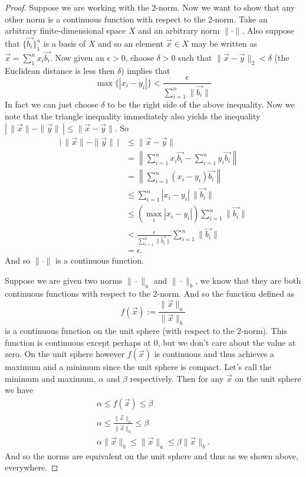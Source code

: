 \documentclass[12pt]{article}
\theoremstyle{theorem}
\theoremstyle{definition}
\begin{document}
\begin{proof}
Suppose we are working with the 2-norm.  Now we want to show that any other
norm is a continuous function with respect to the 2-norm.
Take an arbitrary finite-dimensional space $X$ and
an arbitrary norm $\|\cdot\|$.
Also suppose that $\{ \vec{b_i} \}_1^n$ is a basis of $X$ and so an element
$\vec{x} \in X$ may be written as $\vec{x} = \sum_1^n x_i \vec{b_i}$.
Now given an
$\epsilon > 0$, choose $\delta > 0$ such that  $\| \vec{x} - \vec{y} \|_2 <
\delta$ (the Euclidean distance is less then $\delta$) implies that
\begin{equation*}
\max \{ | x_i - y_i | \} < \frac{\epsilon}{\sum_{i=1}^{n} \|\vec{b_i}\|}
\end{equation*}
In fact we can just choose $\delta$ to be the right side of
the above inequality.
Now we note that the triangle inequality immediately also yields the
inequality $|\,\|\vec{x}\| - \|\vec{y}\|\,| \leq \|\vec{x}-\vec{y}\|$.  So
\begin{equation*}
\begin{split}
\big|\,\|\vec{x}\| - \|\vec{y}\|\,\big| & \leq \|\vec{x}-\vec{y}\|
\\
& = \left\| \sum_{i=1}^n x_i \vec{b_i} - \sum_{i=1}^n y_i \vec{b_i} \right\|
\\
& = \left\| \sum_{i=1}^n (x_i-y_i) \vec{b_i} \right\|
\\
& \leq \sum_{i=1}^n |x_i-y_i|\, \| \vec{b_i} \|
\\
& \leq \left( \max_i |x_i-y_i| \right) \sum_{i=1}^n \| \vec{b_i} \|
\\
& < \frac{\epsilon}{\sum_{i=1}^{n} \|\vec{b_i}\|} \sum_{i=1}^n \| \vec{b_i} \|
\\
& = \epsilon .
\end{split}
\end{equation*}
And so $\|\cdot\|$ is a continuous function.

Suppose we are given two norms $\|\cdot\|_a$ and $\|\cdot\|_b$, we know
that they are both continuous functions with respect to the 2-norm.
And so the function defined as
\begin{equation*}
f(\vec{x}) := \frac{\|\vec{x}\|_a}{\|\vec{x}\|_b}
\end{equation*}
is a continuous function on the unit sphere (with respect to the 2-norm).
This function is continuous except perhaps at 0, but we don't
care about the value at zero.  On the unit sphere however $f(\vec{x})$
is continuous and thus achieves a maximum and a minimum since the unit sphere
is compact.  Let's call the minimum and maximum,
$\alpha$ and $\beta$ respectively.
Then for any $\vec{x}$ on the unit sphere we have
\begin{gather*}
 \alpha
  \leq
 f(\vec{x})
  \leq
 \beta
\\
 \alpha
  \leq
 \frac{\|\vec{x}\|_a}{\|\vec{x}\|_b}
  \leq
 \beta
\\
 \alpha\|\vec{x}\|_b
  \leq
 \|\vec{x}\|_a
  \leq
 \beta\|\vec{x}\|_b .
\end{gather*}
And so the norms are equivalent on the unit sphere and thus as we shown
above, everywhere.
\end{proof}
\end{document}
